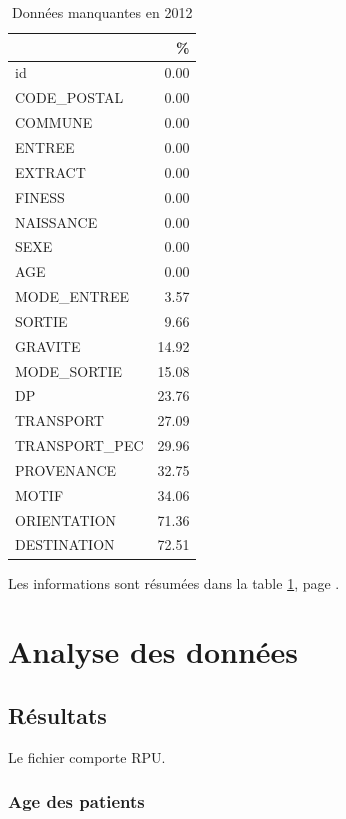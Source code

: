 \documentclass[12pt,english,french]{report}
\begin{document}
\begin{table}[ht]
\centering
\begin{tabular}{|l|r|}
  \hline
 & \% \\ 
  \hline
id & 0.00 \\ 
  CODE\_POSTAL & 0.00 \\ 
  COMMUNE & 0.00 \\ 
  ENTREE & 0.00 \\ 
  EXTRACT & 0.00 \\ 
  FINESS & 0.00 \\ 
  NAISSANCE & 0.00 \\ 
  SEXE & 0.00 \\ 
  AGE & 0.00 \\ 
  MODE\_ENTREE & 3.57 \\ 
  SORTIE & 9.66 \\ 
  GRAVITE & 14.92 \\ 
  MODE\_SORTIE & 15.08 \\ 
  DP & 23.76 \\ 
  TRANSPORT & 27.09 \\ 
  TRANSPORT\_PEC & 29.96 \\ 
  PROVENANCE & 32.75 \\ 
  MOTIF & 34.06 \\ 
  ORIENTATION & 71.36 \\ 
  DESTINATION & 72.51 \\ 
   \hline
\end{tabular}
\caption{Données manquantes en 2012} 
\label{tab2}
\end{table}

Les informations sont résumées dans la table \ref{tab2}, page \pageref{tab2}.

\chapter{Analyse des données}

\section{Résultats}

Le fichier comporte  RPU.

%
%

\subsection{Age des patients}
\end{document}
